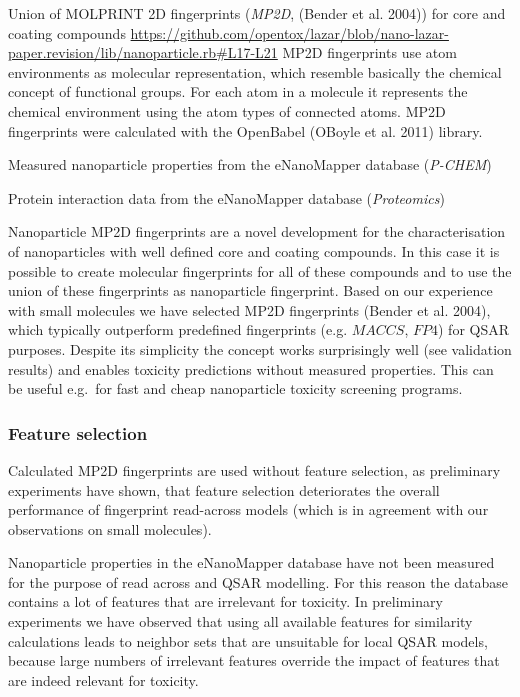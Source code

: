 \documentclass[utf8]{frontiersHLTH} %
\makeatletter
\providecommand{\tightlist}{%
  \setlength{\itemsep}{0pt}\setlength{\parskip}{0pt}}
\newenvironment{description}
	{\list{}{\labelwidth\z@ \itemindent-\leftmargin
		\let\makelabel\descriptionlabel}}
	{\endlist}
\newcommand*\descriptionlabel[1]{\hspace\labelsep
	\normalfont\bfseries #1}
\makeatother
\begin{document}
\begin{description}
\tightlist
\item[Structural descriptors]
Union of MOLPRINT 2D fingerprints (\emph{MP2D}, (Bender et al. 2004))
for core and coating compounds
\url{https://github.com/opentox/lazar/blob/nano-lazar-paper.revision/lib/nanoparticle.rb\#L17-L21}
MP2D fingerprints use atom environments as molecular representation,
which resemble basically the chemical concept of functional groups. For
each atom in a molecule it represents the chemical environment using the
atom types of connected atoms. MP2D fingerprints were calculated with
the OpenBabel (OBoyle et al. 2011) library.
\item[Physico-chemical nanoparticle properties]
Measured nanoparticle properties from the eNanoMapper database
(\emph{P-CHEM})
\item[Biological nanoparticle properties]
Protein interaction data from the eNanoMapper database
(\emph{Proteomics})
\end{description}

Nanoparticle MP2D fingerprints are a novel development for the
characterisation of nanoparticles with well defined core and coating
compounds. In this case it is possible to create molecular fingerprints
for all of these compounds and to use the union of these fingerprints as
nanoparticle fingerprint. Based on our experience with small molecules
we have selected MP2D fingerprints (Bender et al. 2004), which typically
outperform predefined fingerprints (e.g. \(MACCS\), \(FP4\)) for QSAR
purposes. Despite its simplicity the concept works surprisingly well
(see validation results) and enables toxicity predictions without
measured properties. This can be useful e.g.~for fast and cheap
nanoparticle toxicity screening programs.

\subsubsection{Feature selection}\label{feature-selection}

Calculated MP2D fingerprints are used without feature selection, as
preliminary experiments have shown, that feature selection deteriorates
the overall performance of fingerprint read-across models (which is in
agreement with our observations on small molecules).

Nanoparticle properties in the eNanoMapper database have not been
measured for the purpose of read across and QSAR modelling. For this
reason the database contains a lot of features that are irrelevant for
toxicity. In preliminary experiments we have observed that using all
available features for similarity calculations leads to neighbor sets
that are unsuitable for local QSAR models, because large numbers of
irrelevant features override the impact of features that are indeed
relevant for toxicity.
\end{document}
